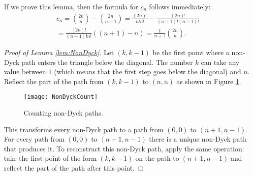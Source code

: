 

\setcounter{section}{4}
\setcounter{subsection}{6}
\setcounter{dfn}{10}


If we prove this lemma, then the formula for $c_n$ follows immediately:
\begin{multline*}
c_n = \binom{2n}{n} - \binom{2n}{n-1} = \frac{(2n)!}{n!n!} - \frac{(2n)!}{(n+1)!(n-1)!}\\
= \frac{(2n)!}{(n+1)!n!}((n+1) - n) = \frac{1}{n+1} \binom{2n}{n}.
\end{multline*}


\begin{proof}[Proof of Lemma \ref{lem:NonDyck}]
Let $(k,k-1)$ be the first point where a non-Dyck path enters the triangle below the diagonal.
The number $k$ can take any value between $1$ (which means that the first step goes below the diagonal) and $n$.
Reflect the part of the path from $(k,k-1)$ to $(n,n)$ as shown in Figure \ref{fig:NonDyckCount}.

\begin{figure}[ht]
\begin{center}
\texttt{[image: NonDyckCount]}
\end{center}
\caption{Counting non-Dyck paths.}
\label{fig:NonDyckCount}
\end{figure}

This transforms every non-Dyck path to a path from $(0,0)$ to $(n+1,n-1)$.
For every path from $(0,0)$ to $(n+1,n-1)$ there is a unique non-Dyck path that produces it.
To reconstruct this non-Dyck path, apply the same operation: take the first point of the form $(k,k-1)$ on the path to $(n+1,n-1)$
and reflect the part of the path after this point.
\end{proof}





